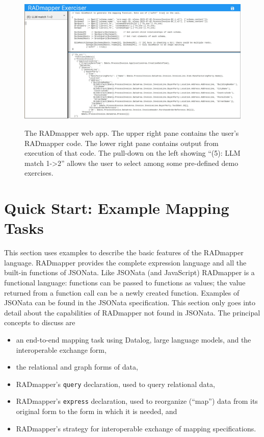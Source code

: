 \documentclass[10pt,letterpaper]{article} %
\newcommand{\stt}[1]{\texttt{#1}} %
\begin{document}
\begin{figure}[H]
  \caption{The RADmapper web app. The upper right pane contains the user's RADmapper code.
    The lower right pane contains output from execution of that code.
    The pull-down on the left showing ``(5): LLM match 1-\textgreater 2'' allows the user to select among some pre-defined demo exercises.}
   \includegraphics[scale=0.173]{RADmapperScreenshot.jpg}
\label{fig:RM-screenshot}
  \centering
\end{figure}


\section{Quick Start: Example Mapping Tasks}
\label{sec:quick-start}

This section uses examples to describe the basic features of the RADmapper language.
RADmapper provides the complete expression language and all the built-in functions of JSONata.
Like JSONata (and JavaScript) RADmapper is a functional language: functions can be passed to functions as values; the value returned from a function call can be a newly created function.
Examples of JSONata can be found in the JSONata specification. %
This section only goes into detail about the capabilities of RADmapper not found in JSONata.
The principal concepts to discuss are

\begin{itemize}
  \item{an end-to-end mapping task using Datalog, large language models, and the interoperable exchange form,}
  \item{the relational and graph forms of data,}
  \item{RADmapper's \stt{query} declaration, used to query relational data,}
  \item{RADmapper's \stt{express} declaration, used to reorganize (``map'') data from its original form to the form in which it is needed, and}
  \item{RADmapper's strategy for interoperable exchange of mapping specifications.}
\end{itemize}
\end{document}
